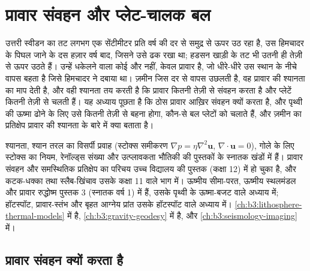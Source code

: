 \chapter{प्रावार संवहन और प्लेट-चालक बल}\label{ch:b3:mantle-convection}

उत्तरी स्वीडन का तट लगभग एक सेंटीमीटर प्रति
वर्ष की दर से समुद्र से ऊपर उठ रहा है, उस हिमचादर के पिघल जाने के दस हज़ार वर्ष बाद, जिसने उसे ढक रखा था;
हडसन खाड़ी के तट भी उतनी ही तेज़ी से ऊपर उठते हैं। उन्हें धकेलने वाला कोई और नहीं, केवल प्रावार है,
जो धीरे-धीरे उस स्थान के नीचे वापस बहता है जिसे हिमचादर ने दबाया था। ज़मीन जिस दर से
वापस उछलती है, वह प्रावार की श्यानता का माप देती है, और वही
श्यानता तय करती है कि प्रावार कितनी तेज़ी से संवहन करता है और प्लेटें कितनी तेज़ी से चलती हैं। यह अध्याय पूछता है
कि ठोस प्रावार आख़िर संवहन क्यों करता है, और पृथ्वी की ऊष्मा ढोने के लिए उसे कितनी तेज़ी से बहना होगा,
कौन-से बल प्लेटों को चलाते हैं, और ज़मीन का प्रतिक्षेप
प्रावार की श्यानता के बारे में क्या बताता है।

\begin{recall}
श्यानता, श्यान तरल का विसर्पी प्रवाह (स्टोक्स समीकरण
$\nabla p = \eta\nabla^2\mathbf u$, $\nabla\cdot\mathbf u = 0$), गोले के लिए स्टोक्स का नियम,
रेनॉल्ड्स संख्या और उत्प्लावकता भौतिकी की पुस्तकों के स्नातक खंडों में हैं। प्रावार संवहन और समस्थितिक प्रतिक्षेप का
परिचय उच्च विद्यालय की पुस्तक (कक्षा 12) में हो चुका है, और
कटक-धक्का तथा स्लैब-खिंचाव उसके कक्षा 11 वाले भाग में।
ऊष्मीय सीमा-परत, ऊष्मीय स्थलमंडल और प्रावार रुद्धोष्म
पुस्तक 3 (स्नातक वर्ष 1) में हैं, उसके पृथ्वी के ऊष्मा-बजट वाले अध्याय में; हॉटस्पॉट,
प्रावार-स्तंभ और बृहत आग्नेय प्रांत उसके हॉटस्पॉट वाले अध्याय में।
 \cref{ch:b3:lithosphere-thermal-models} में है,
 \cref{ch:b3:gravity-geodesy} में है,
और  \cref{ch:b3:seismology-imaging} में।
\end{recall}

\section{प्रावार संवहन क्यों करता है}

